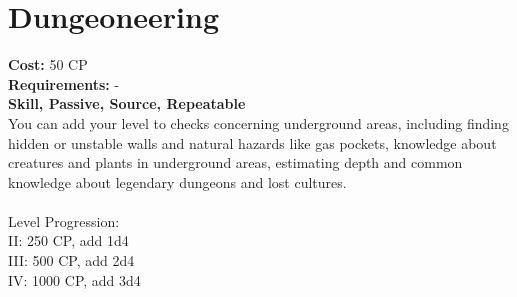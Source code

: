 \section{Dungeoneering}
\textbf{Cost:} 50 CP\\
\textbf{Requirements:} -\\
\textbf{Skill, Passive, Source, Repeatable}\\
You can add your level to checks concerning underground areas, including finding hidden or unstable walls and natural hazards like gas pockets, knowledge about creatures and plants in underground areas, estimating depth and common knowledge about legendary dungeons and lost cultures.\\
\\
Level Progression:\\
II: 250 CP, add 1d4\\
III: 500 CP, add 2d4\\
IV: 1000 CP, add 3d4\\